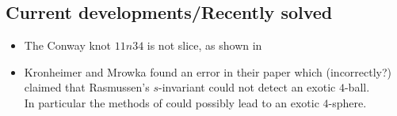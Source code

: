 \subsection{Current developments/Recently solved}

\begin{itemize}
	\item The Conway knot $11n34$ is not slice, as shown
	in \citep{piccirillo2018conway}
	
	\item Kronheimer and Mrowka found an error
	in their paper \citep{kronheimer2013gauge} which
	(incorrectly?) claimed that Rasmussen's $s$-invariant could
	not detect an exotic $4$-ball. \\
	In particular the methods of
	\citep{freedman2009man} could possibly lead
	to an
	exotic $4$-sphere.
	
\end{itemize}